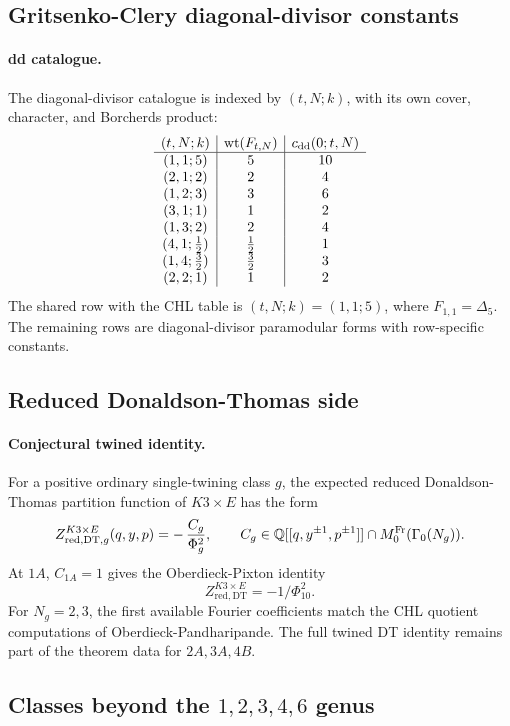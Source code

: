 \subsection*{Gritsenko-Clery diagonal-divisor constants}

\paragraph{dd catalogue.}
The diagonal-divisor catalogue is indexed by \((t,N;k)\), with its own
cover, character, and Borcherds product:
\[
\begin{array}{c|c|c}
(t,N;k) & \operatorname{wt}(F_{t,N}) & c_{\mathrm{dd}}(0;t,N)\\ \hline
(1,1;5) & 5 & 10\\
(2,1;2) & 2 & 4\\
(1,2;3) & 3 & 6\\
(3,1;1) & 1 & 2\\
(1,3;2) & 2 & 4\\
(4,1;\tfrac12) & \tfrac12 & 1\\
(1,4;\tfrac32) & \tfrac32 & 3\\
(2,2;1) & 1 & 2
\end{array}
\]
The shared row with the CHL table is \((t,N;k)=(1,1;5)\), where
\(F_{1,1}=\Delta_5\).  The remaining rows are diagonal-divisor
paramodular forms with row-specific constants.

\subsection*{Reduced Donaldson-Thomas side}

\paragraph{Conjectural twined identity.}
For a positive ordinary single-twining class \(g\), the expected reduced
Donaldson-Thomas partition function of \(K3\times E\) has the form
\[
  Z^{K3\times E}_{\mathrm{red,DT},g}(q,y,p)
  =
  -\,\frac{C_g}{\Phi_g^2},
  \qquad
  C_g\in
  \mathbb Q[[q,y^{\pm1},p^{\pm1}]]\cap
  M^{\mathrm{Fr}}_0(\Gamma_0(N_g)).
\]
At \(1A\), \(C_{1A}=1\) gives the Oberdieck-Pixton identity
\[
  Z^{K3\times E}_{\mathrm{red,DT}}=-1/\Phi_{10}^2.
\]
For \(N_g=2,3\), the first available Fourier coefficients match the
CHL quotient computations of Oberdieck-Pandharipande.  The full twined
DT identity remains part of the theorem data for \(2A,3A,4B\).

\subsection*{Classes beyond the \(1,2,3,4,6\) genus}


